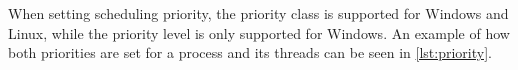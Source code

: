 

When setting scheduling priority, the priority class is supported for Windows and Linux, while the priority level is only supported for Windows. An example of how both priorities are set for a process and its threads can be seen in \cref{lst:priority}.